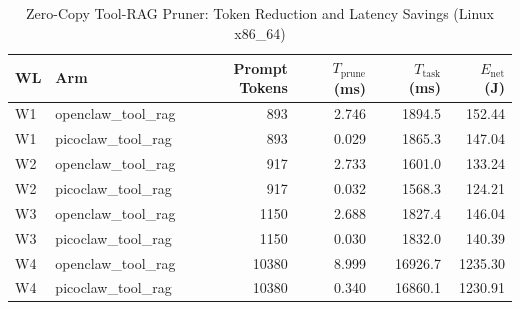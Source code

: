 \begin{table}[t]
\centering\small
\caption{Zero-Copy Tool-RAG Pruner: Token Reduction and Latency Savings (Linux x86_64)}
\label{tab:linux_tool_rag}
\begin{tabular}{llrrrr}
\toprule
WL & Arm & Prompt Tokens & $T_{\text{prune}}$ (ms) & $T_{\text{task}}$ (ms) & $E_{\text{net}}$ (J) \\
\midrule
W1 & openclaw\_tool\_rag & 893 & 2.746 & 1894.5 & 152.44 \\
W1 & picoclaw\_tool\_rag & 893 & 0.029 & 1865.3 & 147.04 \\
W2 & openclaw\_tool\_rag & 917 & 2.733 & 1601.0 & 133.24 \\
W2 & picoclaw\_tool\_rag & 917 & 0.032 & 1568.3 & 124.21 \\
W3 & openclaw\_tool\_rag & 1150 & 2.688 & 1827.4 & 146.04 \\
W3 & picoclaw\_tool\_rag & 1150 & 0.030 & 1832.0 & 140.39 \\
W4 & openclaw\_tool\_rag & 10380 & 8.999 & 16926.7 & 1235.30 \\
W4 & picoclaw\_tool\_rag & 10380 & 0.340 & 16860.1 & 1230.91 \\
\bottomrule
\end{tabular}
\end{table}
